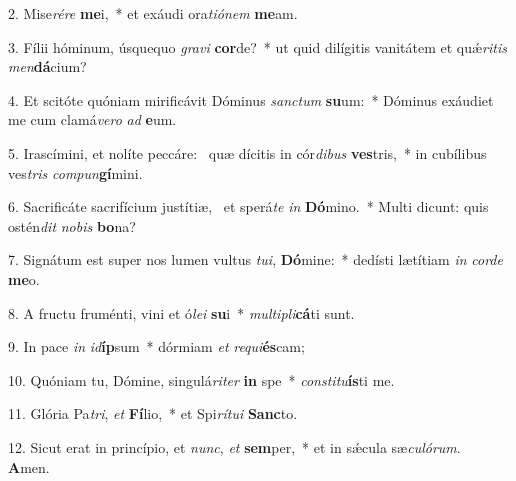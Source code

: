 2. Mise\textit{ré}\textit{re} \textbf{me}i,~*  et exáudi ora\textit{ti}\textit{ó}\textit{nem} \textbf{me}am.\

3. Fílii hóminum, úsquequo \textit{gra}\textit{vi} \textbf{cor}de?~*  ut quid dilígitis vanitátem et quǽ\textit{ri}\textit{tis} \textit{men}\textbf{dá}cium?\

4. Et scitóte quóniam mirificávit Dóminus \textit{sanc}\textit{tum} \textbf{su}um:~*  Dóminus exáudiet me cum clamá\textit{ve}\textit{ro} \textit{ad} \textbf{e}um.\

5. Irascímini, et nolíte peccáre: \dag\  quæ dícitis in cór\textit{di}\textit{bus} \textbf{ves}tris,~*  in cubílibus ves\textit{tris} \textit{com}\textit{pun}\textbf{gí}mini.\

6. Sacrificáte sacrifícium justítiæ, \dag\  et sperá\textit{te} \textit{in} \textbf{Dó}mino.~*  Multi dicunt: quis ostén\textit{dit} \textit{no}\textit{bis} \textbf{bo}na?\

7. Signátum est super nos lumen vultus \textit{tu}\textit{i}, \textbf{Dó}mine:~*  dedísti lætítiam \textit{in} \textit{cor}\textit{de} \textbf{me}o.\

8. A fructu fruménti, vini et ó\textit{le}\textit{i} \textbf{su}i~*  \textit{mul}\textit{ti}\textit{pli}\textbf{cá}ti sunt.\

9. In pace \textit{in} \textit{id}\textbf{íp}sum~*  dórmiam \textit{et} \textit{re}\textit{qui}\textbf{és}cam;\

10. Quóniam tu, Dómine, singulá\textit{ri}\textit{ter} \textbf{in} spe~*  \textit{con}\textit{sti}\textit{tu}\textbf{ís}ti me.\

11. Glória Pa\textit{tri}, \textit{et} \textbf{Fí}lio,~*  et Spi\textit{rí}\textit{tu}\textit{i} \textbf{Sanc}to.\

12. Sicut erat in princípio, et \textit{nunc}, \textit{et} \textbf{sem}per,~*  et in sǽcula sæ\textit{cu}\textit{ló}\textit{rum}. \textbf{A}men.\

